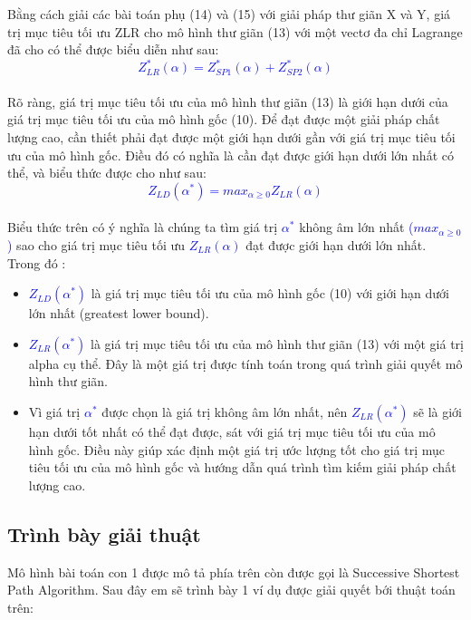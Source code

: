 \documentclass[a4paper]{article}
\begin{document}
Bằng cách giải các bài toán phụ (14) và (15) với giải pháp thư giãn X và Y, giá trị mục tiêu tối ưu ZLR cho mô hình thư giãn (13) với một vectơ đa chỉ Lagrange đã cho có thể được biểu diễn như sau:\\
\textcolor{blue}{$$Z_{LR}^*(\alpha) = Z_{SP1}^*(\alpha) + Z_{SP2}^*(\alpha)$$}\\
Rõ ràng, giá trị mục tiêu tối ưu của mô hình thư giãn (13) là giới hạn dưới của giá trị mục tiêu tối ưu của mô hình gốc (10). Để đạt được một giải pháp chất lượng cao, cần thiết phải đạt được một giới hạn dưới gần với giá trị mục tiêu tối ưu của mô hình gốc. Điều đó có nghĩa là cần đạt được giới hạn dưới lớn nhất có thể, và biểu thức được cho như sau: \\
\textcolor{blue}{$$Z_{LD}(\alpha ^ *) = max_{\alpha \geq 0} Z_{LR}(\alpha)$$}  \\
 Biểu thức trên có ý nghĩa là chúng ta tìm giá trị \textcolor{blue}{$\alpha^*$} không âm lớn nhất \textcolor{blue}{($max_{\alpha \geq 0}$)} sao cho giá trị mục tiêu tối ưu \textcolor{blue}{$Z_{LR}(\alpha)$} đạt được giới hạn dưới lớn nhất. \\
 Trong đó :\\
 \begin{itemize}
     \item \textcolor{blue}{$Z_{LD}(\alpha ^ *)$} là giá trị mục tiêu tối ưu của mô hình gốc (10) với giới hạn dưới lớn nhất (greatest lower bound). \\
     \item \textcolor{blue}{$Z_{LR}(\alpha^*)$} là giá trị mục tiêu tối ưu của mô hình thư giãn (13) với một giá trị alpha cụ thể. Đây là một giá trị được tính toán trong quá trình giải quyết mô hình thư giãn.\\
     \item Vì giá trị \textcolor{blue}{$\alpha^*$} được chọn là giá trị không âm lớn nhất, nên \textcolor{blue}{$Z_{LR}(\alpha^*)$} sẽ là giới hạn dưới tốt nhất có thể đạt được, sát với giá trị mục tiêu tối ưu của mô hình gốc. Điều này giúp xác định một giá trị ước lượng tốt cho giá trị mục tiêu tối ưu của mô hình gốc và hướng dẫn quá trình tìm kiếm giải pháp chất lượng cao.\\
 \end{itemize}

 \subsection{Trình bày giải thuật}
 Mô hình bài toán con 1 được mô tả phía trên còn được gọi là Successive Shortest Path Algorithm. Sau đây em sẽ trình bày 1 ví dụ được giải quyết bới thuật toán trên:
\end{document}

